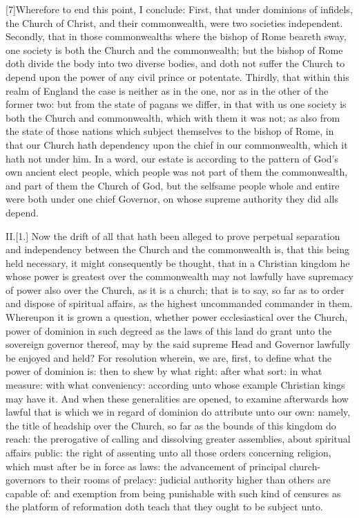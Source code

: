 [7]Wherefore to end this point, I conclude: First, that under dominions of infidels, the Church of Christ, and their commonwealth, were two societies independent. Secondly, that in those commonwealths where the bishop of Rome beareth sway, one society is both the Church and the commonwealth; but the bishop of Rome doth divide the body into two diverse bodies, and doth not suffer the Church to depend upon the power of any civil prince or potentate. Thirdly, that within this realm of England the case is neither as in the one, nor as in the other of the former two: but from the state of pagans we differ, in that with us one society is both the Church and commonwealth, which with them it was not; as also from the state of those nations which subject themselves to the bishop of Rome, in that our Church hath dependency upon the chief in our commonwealth, which it hath not under him. In a word, our estate is according to the pattern of God’s own ancient elect people, which people was not part of them the commonwealth, and part of them the Church of God, but the selfsame people whole and entire were both under one chief Governor, on whose supreme authority they did alls depend.

II.[1.] Now the drift of all that hath been alleged to prove perpetual separation and independency between the Church and the commonwealth is, that this being held necessary, it might consequently be thought, that in a Christian kingdom he whose power is greatest over the commonwealth may not lawfully have supremacy of power also over the  Church, as it is a church; that is to say, so far as to order and dispose of spiritual affairs, as the highest uncommanded commander in them. Whereupon it is grown a question, whether power ecclesiastical over the Church, power of dominion in such degreed as the laws of this land do grant unto the sovereign governor thereof, may by the said supreme Head and Governor lawfully be enjoyed and held? For resolution wherein, we are, first, to define what the power of dominion is: then to shew by what right: after what sort: in what measure: with what conveniency: according unto whose example Christian kings may have it. And when these generalities are opened, to examine afterwards how lawful that is which we in regard of dominion do attribute unto our own: namely, the title of headship over the Church, so far as the bounds of this kingdom do reach: the prerogative of calling and dissolving greater assemblies, about spiritual affairs public: the right of assenting unto all those orders concerning religion, which must after be in force as laws: the advancement of principal church-governors to their rooms of prelacy: judicial authority higher than others are capable of: and exemption from being punishable with such kind of censures as the platform of reformation doth teach that they ought to be subject unto.

